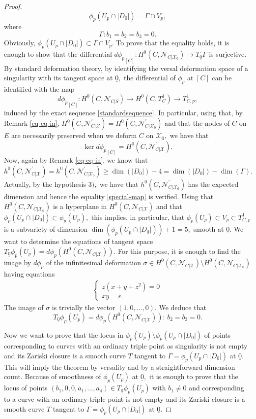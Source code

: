 \documentclass[plain]{amsart}
\begin{document}
\begin{proof}
\begin{equation}
\phi_p(U_p\cap |D_0|)=\Gamma\cap V_p,
\end{equation} 
where $$\Gamma:  b_1= b_2 = b_3=0.$$
Obviously, $\phi_p(U_p\cap |D_0|)\subset\Gamma\cap V_p.$ To prove that
the equality holds, it is enough to show that the differential 
${d\phi_p}_{[C]}:H^0(C,\mathcal N_{C|\mathcal X_0})\to T_{\underline 0}\Gamma$ is surjective. 
By standard deformation theory, by identifying the versal deformation space
of a singularity with its tangent space at $\underline 0,$ the differential 
of $\phi_p$  at $[C]$ can be identified with the map
 $$
{ d\phi_p}_{[C]}:H^0(C,\mathcal N_{C|S})\to H^0(C, T^1_C)\to T^1_{C,p},
 $$
 induced by the exact sequence \eqref{standardsequence}.
In particular, using that, by  Remark \ref{eq-eq-in}, $H^0(C,\mathcal N^\prime_{C|\mathcal X})=
H^0(C,\mathcal N^\prime_{C|\mathcal X_0})$ and that the nodes of $C$ on $E$ are 
necessarily preserved when we deform $C$ on $\mathcal X_0,$
we have that $$\ker{d\phi_p}_{[C]}=H^0(C,\mathcal N^\prime_{C|\mathcal X}).$$
Now, again by Remark \ref{eq-eq-in}, we know that $h^0(C,\mathcal N^\prime_{C|\mathcal X})=
h^0(C,\mathcal N^\prime_{C|\mathcal X_0})\geq \dim(|D_0|)-4=\dim(|D_0|)-\dim(\Gamma).$ 
Actually, by the hypothesis $3),$
we have that $h^0(C,\mathcal N^\prime_{C|\mathcal X_0})$ has the expected dimension
and hence the equality \eqref{special-map} is verified.
Using that $H^0(C,\mathcal N_{C|\mathcal X_0})$
is a hyperplane in $H^0(C,\mathcal N_{C|\mathcal X})$ and that $\phi_p(U_p\cap |D_0|)
\subset\phi_p(U_p),$ this implies, in particular, that $\phi_p(U_p)\subset V_p\subset T^1_{C,p}$ is a subvariety
of dimension $\dim(\phi_p(U_p\cap |D_0|))+1=5,$ smooth at $\underline 0.$ We want to determine 
the equations of tangent space $T_{\underline 0}\phi_p(U_p)=
d\phi_p(H^0(C,\mathcal N_{C|\mathcal X})).$ For this purpose, it is enough to find 
 the image by
$d\phi_p$ of the infinitesimal deformation $\sigma\in H^0(C,\mathcal N_{C|\mathcal X})\setminus
H^0(C,\mathcal N_{C|\mathcal X_0})$ having equations
\begin{eqnarray}
\left\{\begin{array}{l}
z(x+y+z^2)=0\\
xy=\epsilon.
\end{array}\right.
\end{eqnarray}  
The image of $\sigma$ is trivially the vector $(1,0,...,0).$
We deduce that 
$$
T_{\underline 0}\phi_p(U_p)=
d\phi_p(H^0(C,\mathcal N_{C|\mathcal X})):\,b_2=b_3=0.
$$

Now we want to prove that the locus in $\phi_p(U_p)\setminus \phi_p(U_p\cap |D_0|)$ of points
 corresponding to curves with an ordinary triple point as singularity is not
empty and its Zariski closure is a smooth curve $ T$ tangent to 
$\Gamma=\phi_p(U_p\cap |D_0|)$ at $\underline 0.$
This will imply the theorem by versality and by a straightforward dimension count. 
Because of smoothness of $\phi_p(U_p)$ at $\underline 0,$ it is enough to prove that the locus
of points $(b_1,0,0,a_1,...,a_4)\in T_{\underline 0}\phi_p(U_p)$ with $b_1\neq 0$ and  corresponding
to a curve with an ordinary triple point is not empty  and its Zariski closure is a smooth curve $ T$ tangent to 
$\Gamma=\phi_p(U_p\cap |D_0|)$ at $\underline 0.$


\end{proof}
\end{document}
